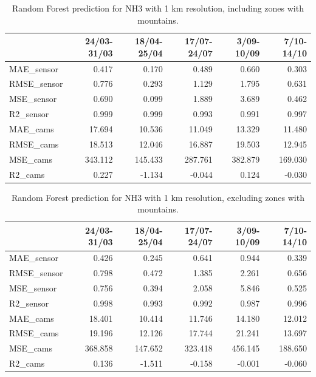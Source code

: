 \begin{table}[H]
\begin{tabular}{lrrrrr}
\toprule
  &  24/03-31/03 &  18/04-25/04 &  17/07-24/07 &  3/09-10/09 &  7/10-14/10 \\
\midrule
 MAE\_sensor &        0.417 &        0.170 &        0.489 &       0.660 &       0.303 \\
RMSE\_sensor &        0.776 &        0.293 &        1.129 &       1.795 &       0.631 \\
 MSE\_sensor &        0.690 &        0.099 &        1.889 &       3.689 &       0.462 \\
  R2\_sensor &        0.999 &        0.999 &        0.993 &       0.991 &       0.997 \\
   MAE\_cams &       17.694 &       10.536 &       11.049 &      13.329 &      11.480 \\
  RMSE\_cams &       18.513 &       12.046 &       16.887 &      19.503 &      12.945 \\
   MSE\_cams &      343.112 &      145.433 &      287.761 &     382.879 &     169.030 \\
    R2\_cams &        0.227 &       -1.134 &       -0.044 &       0.124 &      -0.030 \\
\bottomrule
\end{tabular}
\caption{Random Forest prediction for NH3 with 1 km resolution, including zones with mountains.}
\end{table}


\begin{table}[H]
\begin{tabular}{lrrrrr}
\toprule
  &  24/03-31/03 &  18/04-25/04 &  17/07-24/07 &  3/09-10/09 &  7/10-14/10 \\
\midrule
 MAE\_sensor &        0.426 &        0.245 &        0.641 &       0.944 &       0.339 \\
RMSE\_sensor &        0.798 &        0.472 &        1.385 &       2.261 &       0.656 \\
 MSE\_sensor &        0.756 &        0.394 &        2.058 &       5.846 &       0.525 \\
  R2\_sensor &        0.998 &        0.993 &        0.992 &       0.987 &       0.996 \\
   MAE\_cams &       18.401 &       10.414 &       11.746 &      14.180 &      12.012 \\
  RMSE\_cams &       19.196 &       12.126 &       17.744 &      21.241 &      13.697 \\
   MSE\_cams &      368.858 &      147.652 &      323.418 &     456.145 &     188.650 \\
    R2\_cams &        0.136 &       -1.511 &       -0.158 &      -0.001 &      -0.060 \\
\bottomrule
\end{tabular}
\caption{Random Forest prediction for NH3 with 1 km resolution, excluding zones with mountains.}
\end{table}


